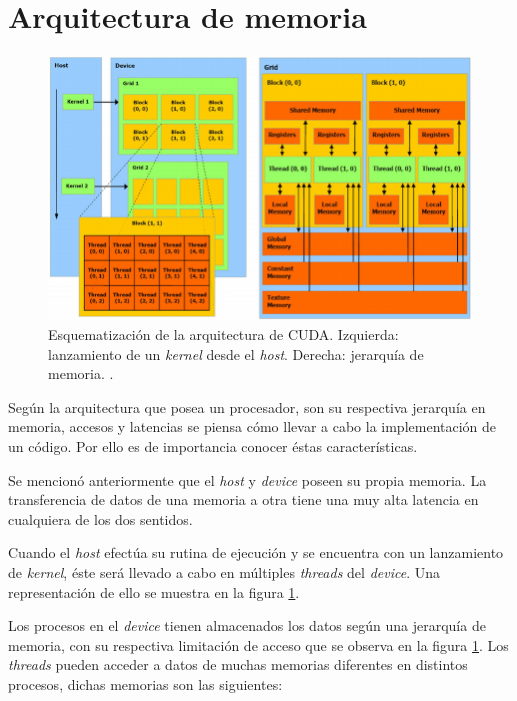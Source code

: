 \section{Arquitectura de memoria}

\begin{figure}[h!]
	\centering
	\includegraphics[width=\textwidth]{figs/cap4/Schematization-of-CUDA-architecture-Schematic-representation-of-CUDA-threads-and-memory.png}
	\caption{Esquematización de la arquitectura de CUDA. Izquierda: lanzamiento de un \textit{kernel} desde el \textit{host}. Derecha: jerarquía de memoria.  \cite{nobile2014cutauleaping}.}
	\label{fig:schedule_architecture_cuda}
\end{figure}

Según la arquitectura que posea un procesador, son su respectiva jerarquía en memoria, accesos y latencias se piensa cómo llevar a cabo la implementación de un código. Por ello es de importancia conocer éstas características. 

Se mencionó anteriormente que el \textit{host} y \textit{device} poseen su propia memoria. La transferencia de datos de una memoria a otra tiene una muy alta latencia en cualquiera de los dos sentidos. 


Cuando el \textit{host} efectúa su rutina de ejecución y se encuentra con un lanzamiento de \textit{kernel}, éste será llevado a cabo en múltiples \textit{threads} del \textit{device}. Una representación de ello se muestra en la figura \ref{fig:schedule_architecture_cuda}. 

Los procesos en el \textit{device} tienen almacenados los datos según una jerarquía de memoria, con su respectiva limitación de acceso que se observa en la figura \ref{fig:schedule_architecture_cuda}. Los \textit{threads} pueden acceder a datos de muchas memorias diferentes en distintos procesos, dichas memorias son las siguientes:

